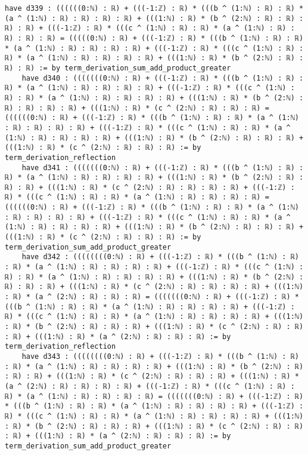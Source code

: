 \documentclass{article}
\begin{document}
\begin{tcolorbox}[colback=white!10, width=\linewidth]
\begin{lstlisting}[language=Lean4]
    have d339 : ((((((0:ℕ) : ℝ) + (((-1:ℤ) : ℝ) * (((b ^ (1:ℕ) : ℝ) : ℝ) * (a ^ (1:ℕ) : ℝ) : ℝ) : ℝ) : ℝ) + (((1:ℕ) : ℝ) * (b ^ (2:ℕ) : ℝ) : ℝ) : ℝ) : ℝ) + (((-1:ℤ) : ℝ) * (((c ^ (1:ℕ) : ℝ) : ℝ) * (a ^ (1:ℕ) : ℝ) : ℝ) : ℝ) : ℝ) = (((((0:ℕ) : ℝ) + (((-1:ℤ) : ℝ) * (((b ^ (1:ℕ) : ℝ) : ℝ) * (a ^ (1:ℕ) : ℝ) : ℝ) : ℝ) : ℝ) + (((-1:ℤ) : ℝ) * (((c ^ (1:ℕ) : ℝ) : ℝ) * (a ^ (1:ℕ) : ℝ) : ℝ) : ℝ) : ℝ) + (((1:ℕ) : ℝ) * (b ^ (2:ℕ) : ℝ) : ℝ) : ℝ) := by term_derivation_sum_add_product_greater
    have d340 : (((((((0:ℕ) : ℝ) + (((-1:ℤ) : ℝ) * (((b ^ (1:ℕ) : ℝ) : ℝ) * (a ^ (1:ℕ) : ℝ) : ℝ) : ℝ) : ℝ) + (((-1:ℤ) : ℝ) * (((c ^ (1:ℕ) : ℝ) : ℝ) * (a ^ (1:ℕ) : ℝ) : ℝ) : ℝ) : ℝ) + (((1:ℕ) : ℝ) * (b ^ (2:ℕ) : ℝ) : ℝ) : ℝ) : ℝ) + (((1:ℕ) : ℝ) * (c ^ (2:ℕ) : ℝ) : ℝ) : ℝ) = ((((((0:ℕ) : ℝ) + (((-1:ℤ) : ℝ) * (((b ^ (1:ℕ) : ℝ) : ℝ) * (a ^ (1:ℕ) : ℝ) : ℝ) : ℝ) : ℝ) + (((-1:ℤ) : ℝ) * (((c ^ (1:ℕ) : ℝ) : ℝ) * (a ^ (1:ℕ) : ℝ) : ℝ) : ℝ) : ℝ) + (((1:ℕ) : ℝ) * (b ^ (2:ℕ) : ℝ) : ℝ) : ℝ) + (((1:ℕ) : ℝ) * (c ^ (2:ℕ) : ℝ) : ℝ) : ℝ) := by term_derivation_reflection
    have d341 : (((((((0:ℕ) : ℝ) + (((-1:ℤ) : ℝ) * (((b ^ (1:ℕ) : ℝ) : ℝ) * (a ^ (1:ℕ) : ℝ) : ℝ) : ℝ) : ℝ) + (((1:ℕ) : ℝ) * (b ^ (2:ℕ) : ℝ) : ℝ) : ℝ) + (((1:ℕ) : ℝ) * (c ^ (2:ℕ) : ℝ) : ℝ) : ℝ) : ℝ) + (((-1:ℤ) : ℝ) * (((c ^ (1:ℕ) : ℝ) : ℝ) * (a ^ (1:ℕ) : ℝ) : ℝ) : ℝ) : ℝ) = ((((((0:ℕ) : ℝ) + (((-1:ℤ) : ℝ) * (((b ^ (1:ℕ) : ℝ) : ℝ) * (a ^ (1:ℕ) : ℝ) : ℝ) : ℝ) : ℝ) + (((-1:ℤ) : ℝ) * (((c ^ (1:ℕ) : ℝ) : ℝ) * (a ^ (1:ℕ) : ℝ) : ℝ) : ℝ) : ℝ) + (((1:ℕ) : ℝ) * (b ^ (2:ℕ) : ℝ) : ℝ) : ℝ) + (((1:ℕ) : ℝ) * (c ^ (2:ℕ) : ℝ) : ℝ) : ℝ) := by term_derivation_sum_add_product_greater
    have d342 : ((((((((0:ℕ) : ℝ) + (((-1:ℤ) : ℝ) * (((b ^ (1:ℕ) : ℝ) : ℝ) * (a ^ (1:ℕ) : ℝ) : ℝ) : ℝ) : ℝ) + (((-1:ℤ) : ℝ) * (((c ^ (1:ℕ) : ℝ) : ℝ) * (a ^ (1:ℕ) : ℝ) : ℝ) : ℝ) : ℝ) + (((1:ℕ) : ℝ) * (b ^ (2:ℕ) : ℝ) : ℝ) : ℝ) + (((1:ℕ) : ℝ) * (c ^ (2:ℕ) : ℝ) : ℝ) : ℝ) : ℝ) + (((1:ℕ) : ℝ) * (a ^ (2:ℕ) : ℝ) : ℝ) : ℝ) = (((((((0:ℕ) : ℝ) + (((-1:ℤ) : ℝ) * (((b ^ (1:ℕ) : ℝ) : ℝ) * (a ^ (1:ℕ) : ℝ) : ℝ) : ℝ) : ℝ) + (((-1:ℤ) : ℝ) * (((c ^ (1:ℕ) : ℝ) : ℝ) * (a ^ (1:ℕ) : ℝ) : ℝ) : ℝ) : ℝ) + (((1:ℕ) : ℝ) * (b ^ (2:ℕ) : ℝ) : ℝ) : ℝ) + (((1:ℕ) : ℝ) * (c ^ (2:ℕ) : ℝ) : ℝ) : ℝ) + (((1:ℕ) : ℝ) * (a ^ (2:ℕ) : ℝ) : ℝ) : ℝ) := by term_derivation_reflection
    have d343 : ((((((((0:ℕ) : ℝ) + (((-1:ℤ) : ℝ) * (((b ^ (1:ℕ) : ℝ) : ℝ) * (a ^ (1:ℕ) : ℝ) : ℝ) : ℝ) : ℝ) + (((1:ℕ) : ℝ) * (b ^ (2:ℕ) : ℝ) : ℝ) : ℝ) + (((1:ℕ) : ℝ) * (c ^ (2:ℕ) : ℝ) : ℝ) : ℝ) + (((1:ℕ) : ℝ) * (a ^ (2:ℕ) : ℝ) : ℝ) : ℝ) : ℝ) + (((-1:ℤ) : ℝ) * (((c ^ (1:ℕ) : ℝ) : ℝ) * (a ^ (1:ℕ) : ℝ) : ℝ) : ℝ) : ℝ) = (((((((0:ℕ) : ℝ) + (((-1:ℤ) : ℝ) * (((b ^ (1:ℕ) : ℝ) : ℝ) * (a ^ (1:ℕ) : ℝ) : ℝ) : ℝ) : ℝ) + (((-1:ℤ) : ℝ) * (((c ^ (1:ℕ) : ℝ) : ℝ) * (a ^ (1:ℕ) : ℝ) : ℝ) : ℝ) : ℝ) + (((1:ℕ) : ℝ) * (b ^ (2:ℕ) : ℝ) : ℝ) : ℝ) + (((1:ℕ) : ℝ) * (c ^ (2:ℕ) : ℝ) : ℝ) : ℝ) + (((1:ℕ) : ℝ) * (a ^ (2:ℕ) : ℝ) : ℝ) : ℝ) := by term_derivation_sum_add_product_greater

\end{lstlisting}
\end{tcolorbox}
\end{document}
